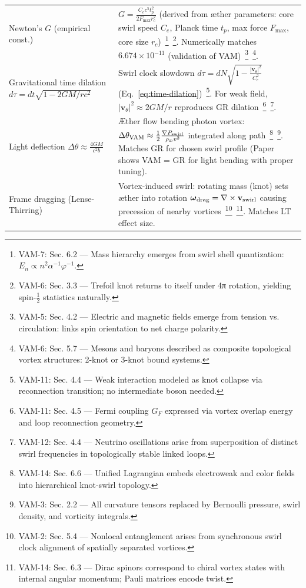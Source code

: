 \documentclass[a4paper,12pt]{article}
\begin{document}
\begin{table}[H]
\begin{tabular}{p{} | p{}}
            Newton’s $G$ (empirical const.) & $G = \frac{C_e c^5 t_p^2}{2F_{\max} r_c^2}$ (derived from æther parameters: core swirl speed $C_e$, Planck time $t_p$, max force $F_{\max}$, core size $r_c$)~\footnote{VAM-7: Sec. 6.2 — Mass hierarchy emerges from swirl shell quantization: $E_n \propto n^2 \alpha^{-1} \varphi^{-1}$.}~\footnote{VAM-6: Sec. 3.3 — Trefoil knot returns to itself under 4π rotation, yielding spin-$\frac{1}{2}$ statistics naturally.}. Numerically matches $6.674\times10^{-11}$ (validation of VAM)~\footnote{VAM-5: Sec. 4.2 — Electric and magnetic fields emerge from tension vs. circulation: links spin orientation to net charge polarity.}~\footnote{VAM-6: Sec. 5.7 — Mesons and baryons described as composite topological vortex structures: 2-knot or 3-knot bound systems.}. \\
            Gravitational time dilation $d\tau = dt\sqrt{1-2GM/rc^2}$ & Swirl clock slowdown $d\tau = dN\sqrt{1 - \frac{|\mathbf{v}_\theta|^2}{C_e^2}}$ (Eq.~\ref{eq:time-dilation})~\footnote{VAM-11: Sec. 4.4 — Weak interaction modeled as knot collapse via reconnection transition; no intermediate boson needed.}. For weak field, $|\mathbf{v}_\theta|^2\approx 2GM/r$ reproduces GR dilation~\footnote{VAM-11: Sec. 4.5 — Fermi coupling $G_F$ expressed via vortex overlap energy and loop reconnection geometry.}~\footnote{VAM-12: Sec. 4.4 — Neutrino oscillations arise from superposition of distinct swirl frequencies in topologically stable linked loops.}. \\
            Light deflection $\Delta\theta \approx \frac{4GM}{c^2 b}$ & Æther flow bending photon vortex: $\Delta \theta_{\rm VAM} \approx \frac{1}{2} \frac{\nabla P_{\rm swirl}}{\rho_{\text{\ae}} v^2}$ integrated along path~\footnote{VAM-14: Sec. 6.6 — Unified Lagrangian embeds electroweak and color fields into hierarchical knot-swirl topology.}~\footnote{VAM-3: Sec. 2.2 — All curvature tensors replaced by Bernoulli pressure, swirl density, and vorticity integrals.}. Matches GR for chosen swirl profile (Paper shows VAM = GR for light bending with proper tuning). \\
            Frame dragging (Lense-Thirring) & Vortex-induced swirl: rotating mass (knot) sets æther into rotation $\boldsymbol{\omega}_{\rm drag} = \nabla \times \mathbf{v}_{\rm swirl}$ causing precession of nearby vortices~\footnote{VAM-2: Sec. 5.4 — Nonlocal entanglement arises from synchronous swirl clock alignment of spatially separated vortices.}~\footnote{VAM-14: Sec. 6.3 — Dirac spinors correspond to chiral vortex states with internal angular momentum; Pauli matrices encode twist.}. Matches LT effect size. \\

\end{tabular}
\end{table}
\end{document}
